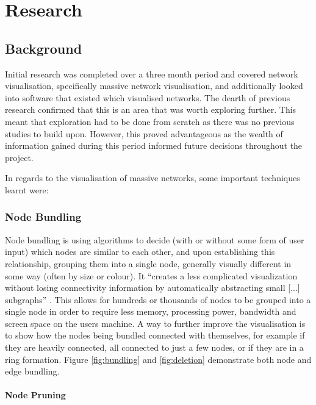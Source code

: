 \documentclass[../dissertation.tex]{subfiles}
\begin{document}
\chapter{Research}
\label{sec:research}

\section{Background}
\label{sec:background}

Initial research was completed over a three month period and covered network visualisation, specifically massive network visualisation, and additionally looked into software that existed which visualised networks. The dearth of previous research confirmed that this is an area that was worth exploring further. This meant that exploration had to be done from scratch as there was no previous studies to build upon. However, this proved advantageous as the wealth of information gained during this period informed future decisions throughout the project.

In regards to the visualisation of massive networks, some important techniques learnt were:

\subsection{Node Bundling}
\label{sec:node_bundling}

Node bundling is using algorithms to decide (with or without some form of user input) which nodes are similar to each other, and upon establishing this relationship, grouping them into a single node, generally visually different in some way (often by size or colour). It ``creates a less complicated visualization without losing connectivity information by automatically abstracting small [...] subgraphs'' \cite{six2003effective}. This allows for hundreds or thousands of nodes to be grouped into a single node in order to require less memory, processing power, bandwidth and screen space on the users machine. A way to further improve the visualisation is to show how the nodes being bundled connected with themselves, for example if they are heavily connected, all connected to just a few nodes, or if they are in a ring formation. Figure \ref{fig:bundling} and \ref{fig:deletion} demonstrate both node and edge bundling.

\subsubsection{Node Pruning}
\label{sec:node-pruning}
\end{document}
